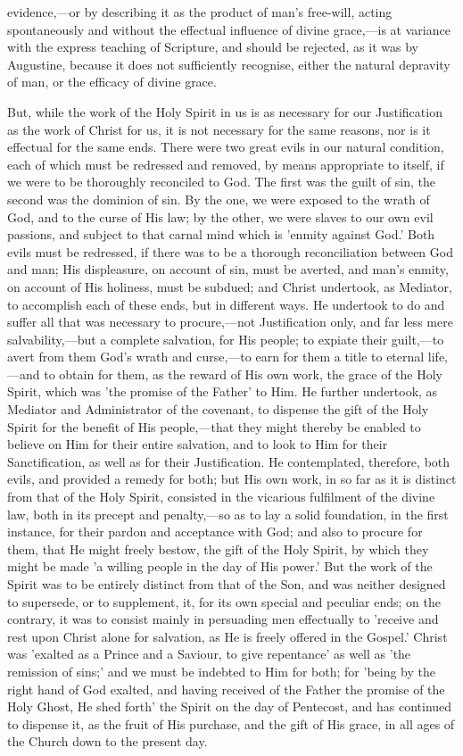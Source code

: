 \documentclass[
]{book}
\begin{document}
evidence,---or by describing it as the product of man's free-will, acting spontaneously and without the effectual influence of divine grace,---is at variance with the express teaching of Scripture, and should be rejected, as it was by Augustine, because it does not sufficiently recognise, either the natural depravity of man, or the efficacy of divine grace.

But, while the work of the Holy Spirit in us is as necessary for our Justification as the work of Christ for us, it is not necessary for the same reasons, nor is it effectual for the same ends. There were two great evils in our natural condition, each of which must be redressed and removed, by means appropriate to itself, if we were to be thoroughly reconciled to God. The first was the guilt of sin, the second was the dominion of sin. By the one, we were exposed to the wrath of God, and to the curse of His law; by the other, we were slaves to our own evil passions, and subject to that carnal mind which is 'enmity against God.' Both evils must be redressed, if there was to be a thorough reconciliation between God and man; His displeasure, on account of sin, must be averted, and man's enmity, on account of His holiness, must be subdued; and Christ undertook, as Mediator, to accomplish each of these ends, but in different ways. He undertook to do and suffer all that was necessary to procure,---not Justification only, and far less mere salvability,---but a complete salvation, for His people; to expiate their guilt,---to avert from them God's wrath and curse,---to earn for them a title to eternal life,---and to obtain for them, as the reward of His own work, the grace of the Holy Spirit, which was 'the promise of the Father' to Him. He further undertook, as Mediator and Administrator of the covenant, to dispense the gift of the Holy Spirit for the benefit of His people,---that they might thereby be enabled to believe on Him for their entire salvation, and to look to Him for their Sanctification, as well as for their Justification. He contemplated, therefore, both evils, and provided a remedy for both; but His own work, in so far as it is distinct from that of the Holy Spirit, consisted in the vicarious fulfilment of the divine law, both in its precept and penalty,---so as to lay a solid foundation, in the first instance, for their pardon and acceptance with God; and also to procure for them, that He might freely bestow, the gift of the Holy Spirit, by which they might be made 'a willing people in the day of His power.' But the work of the Spirit was to be entirely distinct from that of the Son, and was neither designed to supersede, or to supplement, it, for its own special and peculiar ends; on the contrary, it was to consist mainly in persuading men effectually to 'receive and rest upon Christ alone for salvation, as He is freely offered in the Gospel.' Christ was 'exalted as a Prince and a Saviour, to give repentance' as well as 'the remission of sins;' and we must be indebted to Him for both; for 'being by the right hand of God exalted, and having received of the Father the promise of the Holy Ghost, He shed forth' the Spirit on the day of Pentecost, and has continued to dispense it, as the fruit of His purchase, and the gift of His grace, in all ages of the Church down to the present day.
\end{document}
